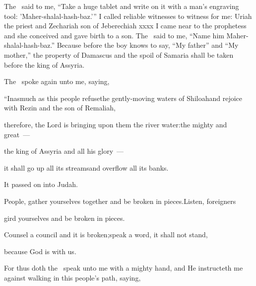 
\begin{inparaenum}
   The \lord\ said to me, ``Take a huge tablet and write on it with a man's engraving tool: 'Maher-shalal-hash-baz.'\thinspace''%
   I called reliable witnesses to witness for me: Uriah the priest and Zechariah son of Jeberechiah xxxx%
   I came near to the prophetess and she conceived and gave birth to a son. The \lord\ said to me, ``Name him Maher-shalal-hash-baz.''%
   Because before the boy knows to say, ``My father'' and ``My mother,'' the property of Damascus and the spoil of Samaria shall be taken before the king of Assyria.%

   The \lord\ spoke again unto me, saying,\smallskip%

  \pb{} ``Inasmuch as this people refuse\pa{}the gently-moving waters of Shiloah\pa{}and rejoice with Rezin and the son of Remaliah,%

  \pb{} therefore, the Lord is bringing upon them the river water:\pa{}the mighty and great~---%

  \pb{}the king of Assyria and all his glory~---%

  \pb{}it shall go up all its streams\pa{}and overflow all its banks.%

  \pb{} It passed on into Judah.%

  \pb{} People, gather yourselves together and be broken in pieces.\pa{}Listen, foreigners%

  \pb{}gird yourselves and be broken in pieces.%

  \pb{} Counsel a council and it is broken;\pa{}speak a word, it shall not stand,%

  \pb{}because God is with us.%

  \noindent {} For thus doth the \lord\ speak unto me with a mighty hand, and He instructeth me against walking in this people's path, saying,\smallskip%


\end{inparaenum}
